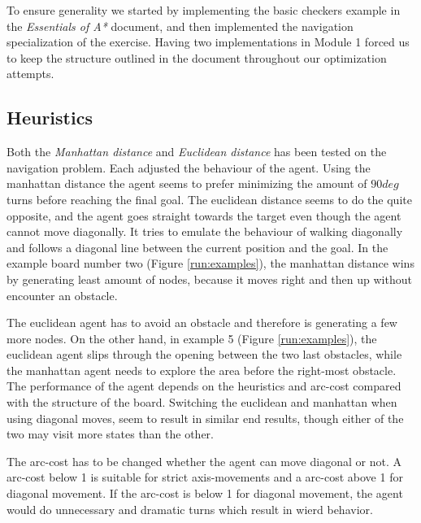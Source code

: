 To ensure generality we started by implementing the basic checkers example in
the \emph{Essentials of A*} document, and then implemented the navigation specialization
of the exercise. Having two implementations in Module 1 forced us to keep the
structure outlined in the document throughout our optimization attempts.

\subsection{Heuristics}
Both the \emph{Manhattan distance} and \emph{Euclidean distance} has been tested on the navigation problem. Each adjusted the behaviour of the agent. Using the manhattan distance the agent seems to prefer minimizing the amount of \(90 deg\) turns before reaching the final goal. The euclidean distance seems to do the quite opposite, and the agent goes straight towards the target even though the agent cannot move diagonally. It tries to emulate the behaviour of walking diagonally and follows a diagonal line between the current position and the goal. In the example board number two (Figure \ref{run:examples}), the manhattan distance wins by generating least amount of nodes, because it moves right and then up without encounter an obstacle. 

The euclidean agent has to avoid an obstacle and therefore is generating a few more nodes. On the other hand, in example 5 (Figure \ref{run:examples}), the euclidean agent slips through the opening between the two last obstacles, while the manhattan agent needs to explore the area before the right-most obstacle. The performance of the agent depends on the heuristics and arc-cost compared with the structure of the board. Switching the euclidean and manhattan when using diagonal moves, seem to result in similar end results, though either of the two may visit more states than the other.

The arc-cost has to be changed whether the agent can move diagonal or not. A arc-cost below 1 is suitable for strict axis-movements and a arc-cost above 1 for diagonal movement. If the arc-cost is below 1 for diagonal movement, the agent would do unnecessary and dramatic turns which result in wierd behavior.

